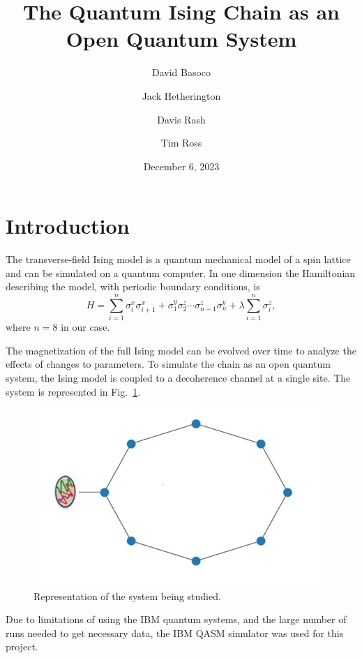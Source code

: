 \documentclass[12pt, twocolumn]{article}
\title{The Quantum Ising Chain as an Open Quantum System}
\author{David Basoco \and Jack Hetherington \and Davis Rash \and Tim Ross}
\date{December 6, 2023}
\begin{document}
  \maketitle

  \section{Introduction}
  The transverse-field Ising model is a quantum mechanical model of a spin lattice and can be simulated on a quantum computer. In one dimension the Hamiltonian describing the model, with periodic boundary conditions, is
  \begin{equation}
    \label{eq:system-hamiltonian}
    H = \sum_{i = 1}^{n} \sigma_{i}^{x} \sigma_{i + 1}^{x}
        + \sigma_{1}^{y} \sigma_{2}^{z} \dotsm \sigma_{n - 1}^{z} \sigma_{n}^{y}
        + \lambda \sum_{i = 1}^{n} \sigma_{i}^{z},
  \end{equation}
  where \( n = 8 \) in our case.

  The magnetization of the full Ising model can be evolved over time to analyze the effects of changes to parameters. To simulate the chain as an open quantum system, the Ising model is coupled to a decoherence channel at a single site. The system is represented in Fig.~\ref{fig:ising-chain-with-environment}.
  \begin{figure}%
    \centering
    \includegraphics[width=\columnwidth]{images/ising_chain_with_environment.png}
    \caption{Representation of the system being studied.%
      \label{fig:ising-chain-with-environment}}
  \end{figure}
  Due to limitations of using the IBM quantum systems, and the large number of runs needed to get necessary data, the IBM QASM simulator was used for this project.
\end{document}
